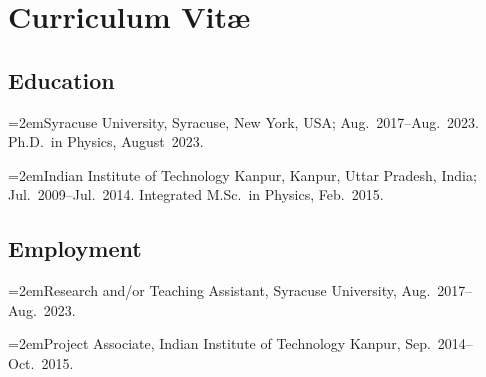 

\chapter*{Curriculum Vit\ae}
\thispagestyle{empty}

\def\hangpar{\noindent\hangindent=2em}

\section*{Education}

\hangpar Syracuse University, Syracuse, New York, USA; Aug.~2017--Aug.~2023.\\
Ph.D.~in Physics, August~2023.

\hangpar Indian Institute of Technology Kanpur, Kanpur, Uttar Pradesh, India; Jul.~2009--Jul.~2014. Integrated M.Sc.~in Physics, Feb.~2015.

\section*{Employment}

\hangpar Research and/or Teaching Assistant, Syracuse University, Aug.~2017--Aug.~2023.

\hangpar Project Associate, Indian Institute of Technology Kanpur, Sep.~2014--Oct.~2015.


